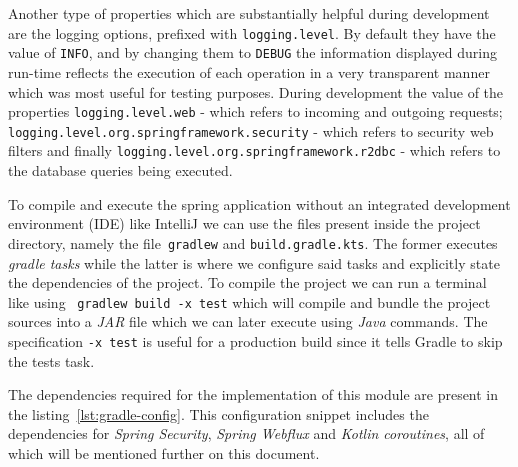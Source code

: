 Another type of properties which are substantially helpful during development are the logging options, prefixed with \lstinline[keywordstyle=\color{black},commentstyle=\color{black},stringstyle=\color{black}]{logging.level}. 
By default they have the value of \lstinline{INFO}, and by changing them to \lstinline{DEBUG} the information displayed during run-time reflects the execution of each operation in a very transparent manner which was most useful for testing purposes. 
During development the value of the properties \lstinline[keywordstyle=\color{black},commentstyle=\color{black},stringstyle=\color{black}]{logging.level.web} - which refers to incoming and outgoing requests; \lstinline[keywordstyle=\color{black},commentstyle=\color{black},stringstyle=\color{black}]{logging.level.org.springframework.security} - which refers to security web filters and finally \lstinline[keywordstyle=\color{black},commentstyle=\color{black},stringstyle=\color{black}]{logging.level.org.springframework.r2dbc} - which refers to the database queries being executed. 

To compile and execute the spring application without an integrated development environment (IDE) like IntelliJ we can use the files present inside the project directory, namely the file~\lstinline{gradlew} and \lstinline{build.gradle.kts}. The former executes \textit{gradle tasks} while the latter is where we configure said tasks and explicitly state the dependencies of the project. 
To compile the project we can run a terminal like using ~\lstinline{gradlew build -x test} which will compile and bundle the project sources into a \textit{JAR} file which we can later execute using \textit{Java} commands. The specification \lstinline{-x test} is useful for a production build since it tells Gradle to skip the tests task.

The dependencies required for the implementation of this module are present in the listing~\ref{lst:gradle-config}. This configuration snippet includes the dependencies for \textit{Spring Security}, \textit{Spring Webflux} and \textit{Kotlin coroutines}, all of which will be mentioned further on this document.

